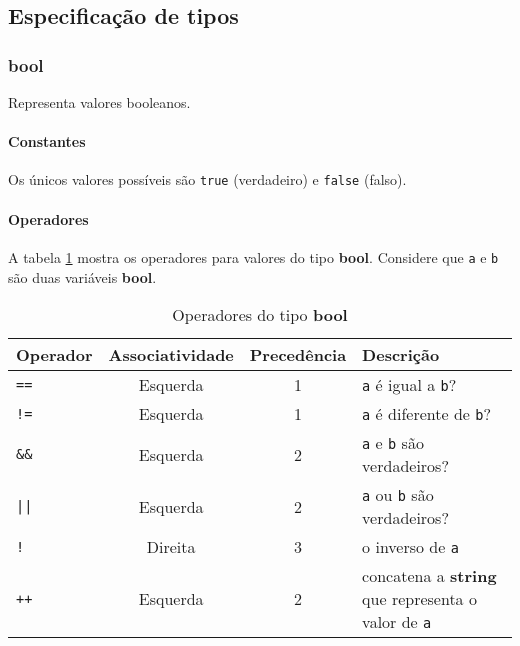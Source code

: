 \subsection{Especificação de tipos}

\subsubsection{bool}
Representa valores booleanos.

\paragraph{Constantes}
Os únicos valores possíveis são \texttt{true} (verdadeiro) e \texttt{false} (falso).

\paragraph{Operadores} A tabela \ref{tab:operadores-bool} mostra os operadores para valores do tipo \textbf{bool}. Considere que \texttt{a} e \texttt{b} são duas variáveis \textbf{bool}.
\begin{table}[!h]
    \centering
    \begin{tabular}{ l c c l }
        Operador      & Associatividade & Precedência & Descrição                                                        \\
        \hline
        \texttt{==}   & Esquerda        & 1           & \texttt{a} é igual a \texttt{b}?                                 \\
        \texttt{!=}   & Esquerda        & 1           & \texttt{a} é diferente de \texttt{b}?                            \\
        \texttt{\&\&} & Esquerda        & 2           & \texttt{a} e \texttt{b} são verdadeiros?                         \\
        \texttt{||}   & Esquerda        & 2           & \texttt{a} ou \texttt{b} são verdadeiros?                        \\
        \texttt{!}    & Direita         & 3           & o inverso de \texttt{a}                                          \\
        \texttt{++}   & Esquerda        & 2           & concatena a \textbf{string} que representa o valor de \texttt{a} \\
        \hline
    \end{tabular}
    \caption{Operadores do tipo \textbf{bool}}
    \label{tab:operadores-bool}
\end{table}

